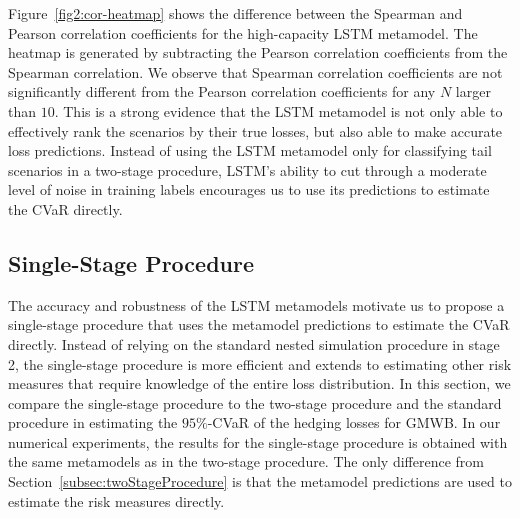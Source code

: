 Figure~\ref{fig2:cor-heatmap} shows the difference between the Spearman and Pearson correlation coefficients for the high-capacity LSTM metamodel.
The heatmap is generated by subtracting the Pearson correlation coefficients from the Spearman correlation.
We observe that Spearman correlation coefficients are not significantly different from the Pearson correlation coefficients for any $N$ larger than $\num{10}$. 
This is a strong evidence that the LSTM metamodel is not only able to effectively rank the scenarios by their true losses, but also able to make accurate loss predictions.
Instead of using the LSTM metamodel only for classifying tail scenarios in a two-stage procedure, LSTM's ability to cut through a moderate level of noise in training labels encourages us to use its predictions to estimate the CVaR directly. 

\subsection{Single-Stage Procedure}

The accuracy and robustness of the LSTM metamodels motivate us to propose a single-stage procedure that uses the metamodel predictions to estimate the CVaR directly. 
Instead of relying on the standard nested simulation procedure in stage 2, the single-stage procedure is more efficient and extends to estimating other risk measures that require knowledge of the entire loss distribution.
In this section, we compare the single-stage procedure to the two-stage procedure and the standard procedure in estimating the $95\%$-CVaR of the hedging losses for GMWB.
In our numerical experiments, the results for the single-stage procedure is obtained with the same metamodels as in the two-stage procedure.
The only difference from Section~\ref{subsec:twoStageProcedure} is that the metamodel predictions are used to estimate the risk measures directly.

